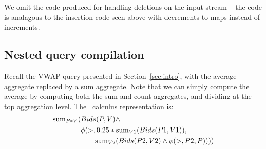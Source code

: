 We omit the code produced for handling deletions on the input stream -- the code
is analagous to the insertion code seen above with decrements to maps instead of
increments.


\subsection{Nested query compilation}
Recall the VWAP query presented in Section~\ref{sec:intro}, with the average
aggregate replaced by a sum aggregate. Note that we can simply compute the
average by computing both the sum and count aggregates, and dividing at the top
aggregation level. The \compiler\ calculus representation is:
\begin{align*}
\mathrm{sum}_{P*V}( & Bids(P,V) \wedge \\
& \phi(>, 0.25*\mathrm{sum}_{V1}(Bids(P1,V1)), \\
& \qquad \mathrm{sum}_{V2}(Bids(P2,V2) \wedge \phi(>,P2,P))))
\end{align*}

